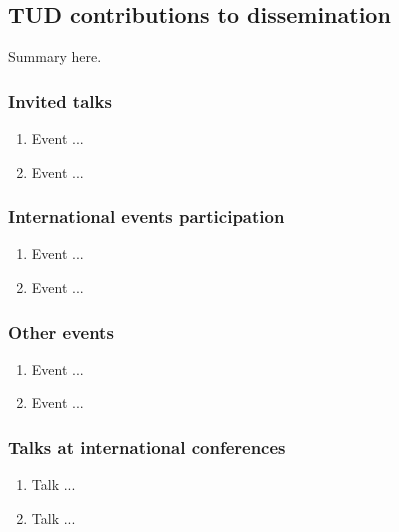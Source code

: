 \subsection{TUD contributions to dissemination}

Summary here.

\subsubsection{Invited talks}

\begin{enumerate}
\item  Event ...

\item  Event ...
\end{enumerate}

\subsubsection{International events participation}

\begin{enumerate}

\item  Event ...

\item  Event ...

\end{enumerate}

\subsubsection{Other events}

\begin{enumerate}

\item  Event ...

\item  Event ...

\end{enumerate}

\subsubsection{Talks at international conferences}

\begin{enumerate}
\item  Talk ...

\item  Talk ...
\end{enumerate}


